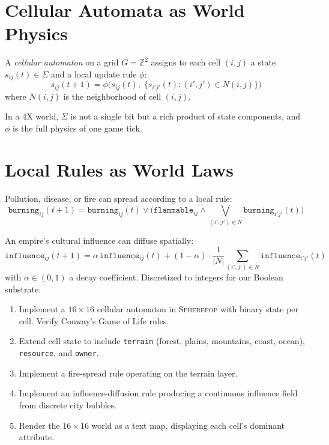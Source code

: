 \documentclass[11pt,a4paper,openany]{book}
\theoremstyle{plain}
\theoremstyle{definition}
\theoremstyle{remark}
\newenvironment{project}[1]{%
  \begin{tcolorbox}[
    title={\textbf{Project: #1}},
    colback=projectbg,
    colframe=sphereblue,
    fonttitle=\bfseries\color{white},
    coltitle=white,
    attach boxed title to top left={yshift=-2mm, xshift=4mm},
    boxed title style={colback=sphereblue, sharp corners},
    sharp corners,
    breakable,
    before upper={\normalfont\setlength{\parindent}{0pt}\tolerance=9999\hbadness=9999}
  ]
}{\end{tcolorbox}}
\newenvironment{mechanic}[1]{%
  \begin{tcolorbox}[
    title={\textbf{World Mechanic:} #1},
    colback=sphereteal!5,
    colframe=sphereteal,
    fonttitle=\bfseries\color{white},
    coltitle=white,
    sharp corners,
    breakable,
    before upper={\normalfont\setlength{\parindent}{0pt}\tolerance=9999\hbadness=9999}
  ]
}{\end{tcolorbox}}
\newcommand{\Sp}{\textsc{Spherepop}\xspace}
\newcommand{\AND}{\ensuremath{\wedge}}
\newcommand{\OR}{\ensuremath{\vee}}
\begin{document}
\section{Cellular Automata as World Physics}

A \emph{cellular automaton} on a grid $G = \mathbb{Z}^2$ assigns to each
cell $(i,j)$ a state $s_{ij}(t) \in \Sigma$ and a local update rule $\phi$:
\[
  s_{ij}(t+1) = \phi\bigl(s_{ij}(t),\; \{s_{i'j'}(t) : (i',j') \in N(i,j)\}\bigr)
\]
where $N(i,j)$ is the neighborhood of cell $(i,j)$.

In a 4X world, $\Sigma$ is not a single bit but a rich product of state
components, and $\phi$ is the full physics of one game tick.

\section{Local Rules as World Laws}

\begin{mechanic}{Terrain Diffusion}
  Pollution, disease, or fire can spread according to a local rule:
  \[
    \texttt{burning}_{ij}(t+1) = \texttt{burning}_{ij}(t) \OR
    \bigl(\texttt{flammable}_{ij} \AND \textstyle\bigvee_{(i',j') \in N}
    \texttt{burning}_{i'j'}(t)\bigr)
  \]
\end{mechanic}

\begin{mechanic}{Influence Fields}
  An empire's cultural influence can diffuse spatially:
  \[
    \texttt{influence}_{ij}(t+1) = \alpha\, \texttt{influence}_{ij}(t) +
    (1-\alpha) \cdot \frac{1}{|N|}\sum_{(i',j')\in N}
    \texttt{influence}_{i'j'}(t)
  \]
  with $\alpha \in (0,1)$ a decay coefficient. Discretized to integers for
  our Boolean substrate.
\end{mechanic}

\begin{project}{Spatial State Machine}
  \begin{enumerate}
    \item Implement a $16 \times 16$ cellular automaton in \Sp{} with
          binary state per cell. Verify Conway's Game of Life rules.
    \item Extend cell state to include \texttt{terrain} (forest, plains,
          mountains, coast, ocean), \texttt{resource}, and \texttt{owner}.
    \item Implement a fire-spread rule operating on the terrain layer.
    \item Implement an influence-diffusion rule producing a continuous
          influence field from discrete city bubbles.
    \item Render the $16\times 16$ world as a text map, displaying
          each cell's dominant attribute.
  \end{enumerate}
\end{project}
\end{document}
